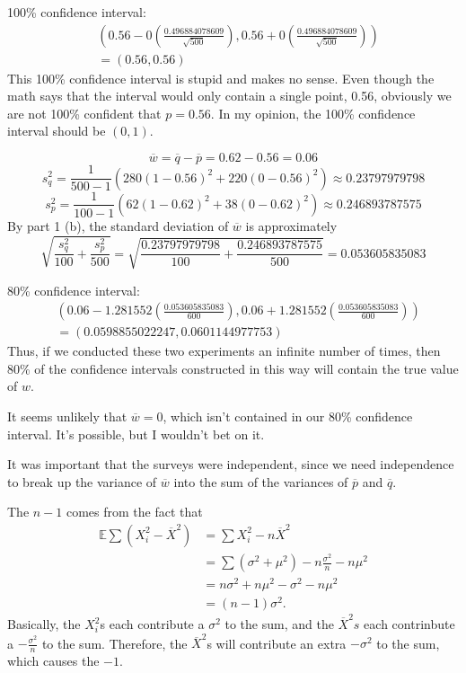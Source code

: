 \documentclass[12pt]{article}
\begin{document}
100\% confidence interval:
\begin{align*}
    & \left(0.56 - 0\left(\frac{0.496884078609}{\sqrt{500}}\right), 0.56 + 0\left(\frac{0.496884078609}{\sqrt{500}}\right) \right) \\
    &= (0.56, 0.56)
\end{align*} This 100\% confidence interval is stupid and makes no sense. Even though the math says that the interval would only contain a single point, 0.56, obviously we are not 100\% confident that $p=0.56$. In my opinion, the 100\% confidence interval should be $(0,1)$.

\newpage
{}

\medskip
{}

    $$\overline w = \overline q - \overline p = 0.62 - 0.56 = 0.06$$
    $$s_q^2 = \frac1{500-1} \left( 280(1-0.56)^2 + 220(0-0.56)^2 \right) \approx 0.23797979798$$
    $$s_p^2 = \frac1{100-1} \left( 62(1-0.62)^2 + 38(0-0.62)^2 \right) \approx 0.246893787575$$
    By part 1 (b), the standard deviation of $\overline w$ is approximately $$\sqrt{\frac{s_q^2}{100} + \frac{s_p^2}{500}} = \sqrt{\frac{0.23797979798}{100} + \frac{0.246893787575}{500}} = 0.053605835083$$

    80\% confidence interval:
    \begin{align*}
        & \left( 0.06 - 1.281552\left( \frac{0.053605835083}{600} \right), 0.06 + 1.281552\left( \frac{0.053605835083}{600} \right) \right) \\
        &= (0.0598855022247, 0.0601144977753)
    \end{align*} Thus, if we conducted these two experiments an infinite number of times, then 80\% of the confidence intervals constructed in this way will contain the true value of $w$.

\medskip
{} It seems unlikely that $\overline w = 0$, which isn't contained in our 80\% confidence interval. It's possible, but I wouldn't bet on it.

\medskip
{} It was important that the surveys were independent, since we need independence to break up the variance of $\overline w$ into the sum of the variances of $\overline p$ and $\overline q$.

\newpage
{}

\medskip
{} The $n-1$ comes from the fact that
\begin{align*}
    \mathbb E\sum(X_i^2 - \overline X^2) &= \sum X_i^2 - n\overline X^2 \\
                                         &= \sum(\sigma^2 + \mu^2) - n\frac{\sigma^2}{n} - n\mu^2 \\
                                         &= n\sigma^2 + n\mu^2 - \sigma^2 - n\mu^2 \\
                                         &= (n-1)\sigma^2.
\end{align*} Basically, the $X_i^2$s each contribute a $\sigma^2$ to the sum, and the $\overline X^2s$ each contrinbute a $-\frac{\sigma^2}n$ to the sum. Therefore, the $\overline X^2$s will contribute an extra $-\sigma^2$ to the sum, which causes the $-1$.
\end{document}

